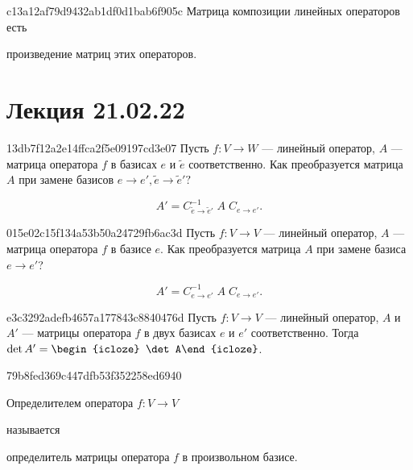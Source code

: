 \begin{note}{c13a12af79d9432ab1df0d1bab6f905c}
    Матрица композиции линейных операторов есть \begin{icloze}{1}произведение матриц этих операторов.\end{icloze}
\end{note}

\section{Лекция 21.02.22}
\begin{note}{13db7f12a2e14ffca2f5e09197cd3e07}
    Пусть \( f : V \to W \) --- линейный оператор,  \( A \) --- матрица оператора \( f \) в базисах \( e \) и \( \tilde e \) соответственно. Как преобразуется матрица \( A \) при замене базисов \( e \to e', \tilde e \to \tilde e'? \)

    \begin{cloze}{1}
        \[
            A' = C^{-1}_{\tilde e \to \tilde e'} \; A \; C_{e \to e'}.
        \]
    \end{cloze}
\end{note}

\begin{note}{015e02c15f134a53b50a24729fb6ac3d}
    Пусть \( f : V \to V \) --- линейный оператор,  \( A \) --- матрица оператора \( f \) в базисе \( e \). Как преобразуется матрица \( A \) при замене базиса \( e \to e' \)?

    \begin{cloze}{1}
        \[
            A' = C^{-1}_{e \to e'} \; A \; C_{e \to e'}.
        \]
    \end{cloze}
\end{note}

\begin{note}{e3c3292adefb4657a177843c8840476d}
    Пусть \( f : V \to V \) --- линейный оператор, \( A \) и \( A' \) --- матрицы оператора \( f \) в двух базисах \( e \) и \( e' \) соответственно.
    Тогда \( \det A' = \begin{icloze}{1}\det A\end{icloze} \).
\end{note}

\begin{note}{79b8fed369c447dfb53f352258ed6940}
    \begin{icloze}{2}Определителем оператора \( f : V \to V \)\end{icloze} называется \begin{icloze}{1}о\-пре\-де\-ли\-тель матрицы оператора \( f \) в произвольном базисе.\end{icloze}
\end{note}

